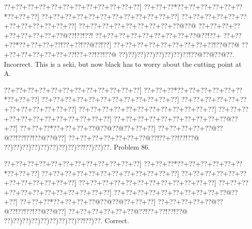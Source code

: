 \documentclass[a5paper]{article}
\begin{document}
\begin{center}
{\goo
\0??+\0??+\0??+\0??+\0??+\0??+\0??+\0??+\0??+\0??+\0??+\0??]
\0??+\0??+\0??*\0??+\0??+\0??+\0??+\0??+\0??*\0??+\0??+\0??]
\0??+\0??+\0??+\0??+\0??+\0??+\0??+\0??+\0??+\0??+\0??+\0??]
\0??+\0??+\0??+\0??+\0??+\0??+\0??+\0??+\0??+\0??+\0??+\0??]
\0??+\0??+\0??+\0??+\0??+\0??+\0??+\0??+\0??@\0??@
\0??+\0??+\0??+\0??+\0??+\0??+\0??+\0??+\0??@\0??!\0??!\0??!
\0??+\0??+\0??+\0??+\0??+\0??+\0??+\0??+\0??@\0??!\0??+
\0??+\0??+\0??*\0??+\0??+\0??+\0??!\0??+\0??!\0??@\0??!\0??]
\0??+\0??+\0??+\0??+\0??+\0??+\0??+\0??+\0??!\0??@\0??@
\0??+\0??+\0??+\0??+\0??+\0??+\0??!\0??+\0??!\0??!\0??@
\0??)\0??)\0??)\0??)\0??)\0??)\0??)\0??!\0??@\0??@\0??@\0??.
}
Incorrect. This is a seki, but now black has to worry about the cutting point at A.

\end{center}
\newpage
\begin{center}
{\goo
\0??+\0??+\0??+\0??+\0??+\0??+\0??+\0??+\0??+\0??+\0??+\0??]
\0??+\0??+\0??*\0??+\0??+\0??+\0??+\0??+\0??*\0??+\0??+\0??]
\0??+\0??+\0??+\0??+\0??+\0??+\0??+\0??+\0??+\0??+\0??+\0??]
\0??+\0??+\0??+\0??+\0??+\0??+\0??+\0??+\0??+\0??+\0??+\0??]
\0??+\0??+\0??+\0??+\0??+\0??+\0??+\0??+\0??+\0??+\0??+\0??]
\0??+\0??+\0??+\0??+\0??+\0??+\0??+\0??+\0??+\0??+\0??+\0??]
\0??+\0??+\0??+\0??+\0??+\0??+\0??+\0??+\0??+\0??@\0??+\0??]
\0??+\0??+\0??*\0??+\0??+\0??+\0??@\0??@\0??@\0??+\0??+\0??]
\0??+\0??+\0??+\0??+\0??@\0??@\0??!\0??!\0??!\0??@\0??@\0??]
\0??+\0??+\0??+\0??+\0??+\0??+\0??@\0??!\0??+\0??!\0??!\0??@
\0??)\0??)\0??)\0??)\0??)\0??)\0??)\0??)\0??!\0??)\0??)\0??.
}
Problem 86.

\end{center}
\begin{center}
{\goo
\0??+\0??+\0??+\0??+\0??+\0??+\0??+\0??+\0??+\0??+\0??+\0??]
\0??+\0??+\0??*\0??+\0??+\0??+\0??+\0??+\0??*\0??+\0??+\0??]
\0??+\0??+\0??+\0??+\0??+\0??+\0??+\0??+\0??+\0??+\0??+\0??]
\0??+\0??+\0??+\0??+\0??+\0??+\0??+\0??+\0??+\0??+\0??+\0??]
\0??+\0??+\0??+\0??+\0??+\0??+\0??+\0??+\0??+\0??+\0??+\0??]
\0??+\0??+\0??+\0??+\0??+\0??+\0??+\0??+\0??+\0??+\0??+\0??]
\0??+\0??+\0??+\0??+\0??+\0??+\0??+\0??+\0??+\0??@\0??+\0??]
\0??+\0??+\0??*\0??+\0??+\0??+\0??@\0??@\0??@\0??+\0??+\0??]
\0??+\0??+\0??+\0??+\0??@\0??@\0??!\0??!\0??!\0??@\0??@\0??]
\0??+\0??+\0??+\0??+\0??+\0??@\0??!\0??+\0??!\0??!\0??@
\0??)\0??)\0??)\0??)\0??)\0??)\0??)\0??)\0??!\0??)\0??.
}
Correct. 

\end{center}
\end{document}
